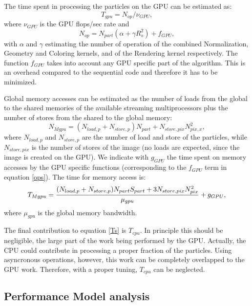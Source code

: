 \documentclass[11pt]{article}
\begin{document}
The time spent in processing the particles on the GPU can be estimated as:
\begin{equation}
T_{gpu} = N_{op}/\nu_{GPU},
\end{equation}
where $\nu_{GPU}$ is the GPU flops/sec rate and
\begin{equation}\label{ops}
N_{op} = N_{part}(\alpha + \gamma R_s^2) + f_{GPU},
\end{equation}
with $\alpha$ and $\gamma$ estimating the number of operation of 
the combined Normalization, Geometry and Coloring kernels,  
and of the Rendering kernel respectively. The function 
$f_{GPU}$ takes into account any GPU specific part of the algorithm. 
This is an overhead compared to the sequential code and therefore it has to 
be minimized.

Global memory accesses can be estimated 
as the number of loads from the global to the shared memories of the available 
streaming multiprocessors plus the number of stores from the shared to the global memory: 
\begin{equation}
N_{Mgpu} = (N_{load,p} + N_{store,p}) N_{part} + N_{store,pix} N_{pix,x}^2,
\end{equation}
where $N_{load,p}$ and $N_{store,p}$ are the number of load and store of the 
particles, while $N_{store,pix}$ is the number of stores of the image (no loads 
are expected, since the image is created on the GPU). 
We indicate with $g_{GPU}$ the time spent on memory accesses by the GPU specific 
functions (corresponding to the $f_{GPU}$ term in equation \eqref{ops}). 
The time for memory access is:
\begin{equation}\label{tmgpu}
T_{Mgpu} = {(N_{load,p} + N_{store,p}) N_{part} S_{part} 
+ 3 N_{store,pix} N_{pix}^2\over \mu_{gpu}}
+ g_{GPU},
\end{equation}
where $\mu_{gpu}$ is the global memory bandwidth.

The final contribution to equation \eqref{Ts} is $T_{cpu}$. In principle this should be negligible, 
the large part of the work being performed by the GPU. Actually, the CPU
could contribute in processing a proper fraction of the particles. Using
asyncronous operations, however, this work can be completely overlapped 
to the GPU work. Therefore, with a proper tuning, $T_{cpu}$ can be neglected.

\subsection{Performance Model analysis}
\end{document}
